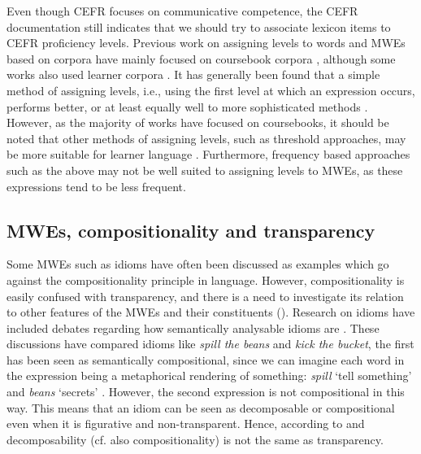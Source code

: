 \documentclass[output=paper,colorlinks,citecolor=brown]{langscibook}
\begin{document}
Even though CEFR focuses on communicative competence, the CEFR documentation \citep{council2001common,coe2020companion}   
still indicates that we should try to associate lexicon items to CEFR proficiency levels. Previous work on assigning levels to words and MWEs based on corpora have mainly focused on coursebook corpora \citep{gala2013towards,gala2014modele,franccois2014flelex,franccois2016svalex,durlich2018efllex,tack2018nt2lex}, although some works also used learner corpora \citep{volodina2016swellex,alfter2016distributions}. It has generally been found that a simple method of assigning levels, i.e., using the first level at which an expression occurs, performs better, or at least equally well to more sophisticated methods \citep{gala2014modele,alfter2021exploring}. However, as the majority of works have focused on coursebooks, it should be noted that other methods of assigning levels, such as threshold approaches, may be more suitable for learner language \citep{alfter2021exploring,yamaguchi2022towards}. Furthermore, frequency based approaches such as the above may not be well suited to assigning levels to MWEs, as these expressions tend to be less frequent.


\subsection{MWEs, compositionality and transparency}\label{sec:compos}

Some MWEs such as idioms have often been discussed as examples which go against the compositionality principle in language. However, compositionality is easily confused with transparency, and there is a need to investigate its relation to other features of the MWEs and their constituents (). Research on idioms have included debates regarding how semantically analysable idioms are \citep[][]{cieslicka2015idiom}. These discussions have compared idioms like \textit{spill the beans} and \textit{kick the bucket}, the first has been seen as semantically compositional, since we can imagine each word in the expression being a metaphorical rendering of something: \textit{spill} `tell something' and \textit{beans} `secrets' \citep{Nunberg_etal_1994,cieslicka2015idiom}. However, the second expression is not compositional in this way. This means that an idiom can be seen as decomposable or compositional even when it is figurative and non-transparent. Hence, according to \citet{cieslicka2015idiom} and \citet[][495]{Nunberg_etal_1994} decomposability (cf. also compositionality) is not the same as transparency. 
\end{document}
